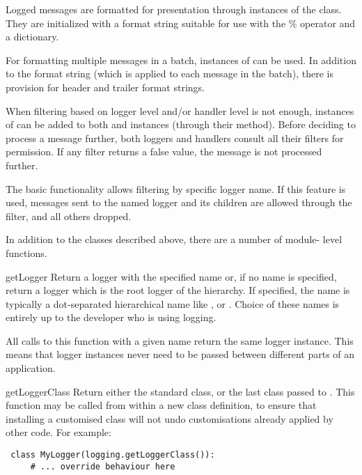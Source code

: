 Logged messages are formatted for presentation through instances of the
 class. They are initialized with a format string
suitable for use with the \% operator and a dictionary.

For formatting multiple messages in a batch, instances of
 can be used. In addition to the format string
(which is applied to each message in the batch), there is provision for
header and trailer format strings.

When filtering based on logger level and/or handler level is not enough,
instances of  can be added to both  and
 instances (through their  method).
Before deciding to process a message further, both loggers and handlers
consult all their filters for permission. If any filter returns a false
value, the message is not processed further.

The basic  functionality allows filtering by specific logger
name. If this feature is used, messages sent to the named logger and its
children are allowed through the filter, and all others dropped.

In addition to the classes described above, there are a number of module-
level functions.

\begin{funcdesc}{getLogger}{}
Return a logger with the specified name or, if no name is specified, return
a logger which is the root logger of the hierarchy. If specified, the name
is typically a dot-separated hierarchical name like , 
or . Choice of these names is entirely up to the developer
who is using logging.

All calls to this function with a given name return the same logger instance.
This means that logger instances never need to be passed between different
parts of an application.
\end{funcdesc}

\begin{funcdesc}{getLoggerClass}{}
Return either the standard  class, or the last class passed to
. This function may be called from within a new
class definition, to ensure that installing a customised  class
will not undo customisations already applied by other code. For example:

\begin{verbatim}
 class MyLogger(logging.getLoggerClass()):
     # ... override behaviour here
\end{verbatim}

\end{funcdesc}

